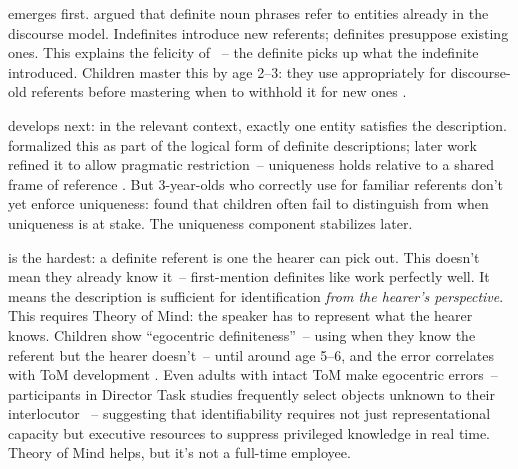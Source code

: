  emerges first. \textcite{heim1982} argued that definite noun phrases refer to entities already in the discourse model. Indefinites introduce new referents; definites presuppose existing ones. This explains the felicity of ~-- the definite picks up what the indefinite introduced. Children master this by age 2--3: they use  appropriately for discourse-old referents before mastering when to withhold it for new ones \citep{rozendaalbaker2008}.

 develops next: in the relevant context, exactly one entity satisfies the description. \textcite{russell1905} formalized this as part of the logical form of definite descriptions; later work refined it to allow pragmatic restriction~-- uniqueness holds relative to a shared frame of reference \citep{hawkins1978}. But 3-year-olds who correctly use  for familiar referents don't yet enforce uniqueness: \textcite{brockmann2018} found that children often fail to distinguish  from  when uniqueness is at stake. The uniqueness component stabilizes later.

 is the hardest: a definite referent is one the hearer can pick out. This doesn't mean they already know it~-- first-mention definites like  work perfectly well. It means the description is sufficient for identification \emph{from the hearer's perspective}. This requires Theory of Mind: the speaker has to represent what the hearer knows. Children show \enquote{egocentric definiteness}~-- using  when they know the referent but the hearer doesn't~-- until around age 5--6, and the error correlates with ToM development \citep{decat2013}. Even adults with intact ToM make egocentric errors~-- participants in Director Task studies frequently select objects unknown to their interlocutor \citep{keysar2000}~-- suggesting that identifiability requires not just representational capacity but executive resources to suppress privileged knowledge in real time. Theory of Mind helps, but it's not a full-time employee.

